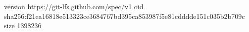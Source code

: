 version https://git-lfs.github.com/spec/v1
oid sha256:f21ea16818e513323ce3684767bd395ca853987f5e81cdddde151c035b2b709c
size 1398236
